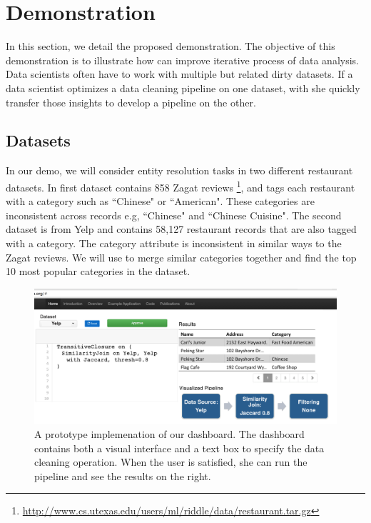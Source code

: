 \section{Demonstration}
In this section, we detail the proposed demonstration.
The objective of this demonstration is to illustrate 
how \sys can improve iterative process of data analysis.
Data scientists often have to work with multiple but related dirty datasets.
If a data scientist optimizes a data cleaning pipeline on one dataset, with \sys 
she quickly transfer those insights to develop a pipeline on the other.

\subsection{Datasets}
In our demo, we will consider entity resolution tasks in two different restaurant datasets.
In first dataset contains 858 Zagat reviews \footnote{\scriptsize{ \url{http://www.cs.utexas.edu/users/ml/riddle/data/restaurant.tar.gz}}},
and tags each restaurant with a category such as ``Chinese" or ``American".
These categories are inconsistent across records e.g, ``Chinese" and ``Chinese Cuisine".
The second dataset is from Yelp and contains 58,127 restaurant records that are also tagged with a category.
The category attribute is inconsistent in similar ways to the Zagat reviews.
We will use \sys to merge similar categories together and find the top 10 most popular categories in the dataset.

\begin{figure}[t]
\centering
 \includegraphics[width=\columnwidth]{figs/dashboard_screenshot.png}
 \caption{A prototype implemenation of our \sys dashboard. The dashboard contains both a visual interface and a text box to specify the data cleaning operation. When the user is satisfied, she can run the pipeline and see the results on the right. \label{screenshot}}\vspace{-1.75em}
\end{figure}



